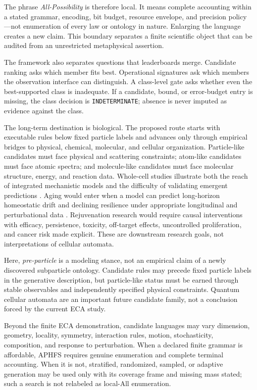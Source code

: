 \documentclass[10pt]{article}
\theoremstyle{definition}
\begin{document}
The phrase \emph{All-Possibility} is therefore local. It means complete accounting within a stated
grammar, encoding, bit budget, resource envelope, and precision policy---not enumeration of every
law or ontology in nature. Enlarging the language creates a new claim. This boundary separates a
finite scientific object that can be audited from an unrestricted metaphysical assertion.

The framework also separates questions that leaderboards merge. Candidate ranking asks which
member fits best. Operational signatures ask which members the observation interface can
distinguish. A class-level gate asks whether even the best-supported class is inadequate. If a
candidate, bound, or error-budget entry is missing, the class decision is \texttt{INDETERMINATE};
absence is never imputed as evidence against the class.

The long-term destination is biological. The proposed route starts with executable rules below
fixed particle labels and advances only through empirical bridges to physical, chemical,
molecular, and cellular organization. Particle-like candidates must face physical and scattering
constraints; atom-like candidates must face atomic spectra; and molecule-like candidates must
face molecular structure, energy, and reaction data. Whole-cell studies illustrate both the reach of integrated
mechanistic models and the difficulty of validating emergent predictions
\citep{karr2012,thornburg2022,thornburg2026,thornburg2026correction}. Aging would enter when a model
can predict long-horizon homeostatic drift and declining resilience under appropriate longitudinal
and perturbational data \citep{lopezotin2013,lopezotin2023}. Rejuvenation research would require
causal interventions with efficacy, persistence, toxicity, off-target effects, uncontrolled
proliferation, and cancer risk
made explicit. These are downstream research goals, not interpretations of cellular automata.

Here, \emph{pre-particle} is a modeling stance, not an empirical claim of a newly discovered
subparticle ontology. Candidate rules may precede fixed particle labels in the generative
description, but particle-like status must be earned through stable observables and independently
specified physical constraints. Quantum cellular automata are an important future candidate
family, not a conclusion forced by the current ECA study.

Beyond the finite ECA demonstration, candidate languages may vary dimension, geometry, locality,
symmetry, interaction rules, motion, stochasticity, composition, and response to perturbation.
When a declared finite grammar is affordable, APHFS requires genuine enumeration and complete
terminal accounting. When it is not, stratified, randomized, sampled, or adaptive generation may
be used only with its coverage frame and missing mass stated; such a search is not relabeled as
local-All enumeration.
\end{document}
